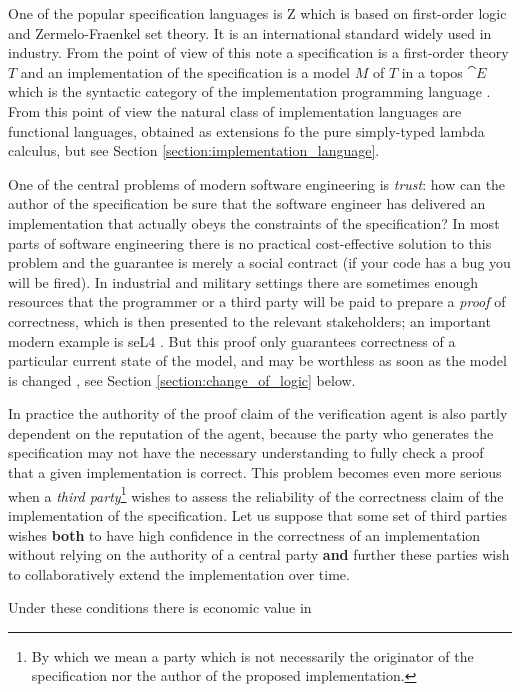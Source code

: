 \documentclass[english,letter paper,12pt,reqno]{article}
\theoremstyle{example}
\begin{document}
One of the popular specification languages is Z \cite{potter} which is based on first-order logic and Zermelo-Fraenkel set theory. It is an international standard widely used in industry. From the point of view of this note a specification is a first-order theory $T$ and an implementation of the specification is a model $M$ of $T$ in a topos $\cat{E}$ which is the syntactic category of the implementation programming language \cite{lambekscott}. From this point of view the natural class of implementation languages are functional languages, obtained as extensions fo the pure simply-typed lambda calculus, but see Section \ref{section:implementation_language}.

One of the central problems of modern software engineering is \emph{trust}: how can the author of the specification be sure that the software engineer has delivered an implementation that actually obeys the constraints of the specification? In most parts of software engineering there is no practical cost-effective solution to this problem and the guarantee is merely a social contract (if your code has a bug you will be fired). In industrial and military settings there are sometimes enough resources that the programmer or a third party will be paid to prepare a \emph{proof} of correctness, which is then presented to the relevant stakeholders; an important modern example is seL4 \cite{sel4}. But this proof only guarantees correctness of a particular current state of the model, and may be worthless as soon as the model is changed \cite{bp}, see Section \ref{section:change_of_logic} below.

In practice the authority of the proof claim of the verification agent is also partly dependent on the reputation of the agent, because the party who generates the specification may not have the necessary understanding to fully check a proof that a given implementation is correct. This problem becomes even more serious when a \emph{third party}\footnote{By which we mean a party which is not necessarily the originator of the specification nor the author of the proposed implementation.} wishes to assess the reliability of the correctness claim of the implementation of the specification. Let us suppose that some set of third parties wishes \textbf{both} to have high confidence in the correctness of an implementation without relying on the authority of a central party \textbf{and} further these parties wish to collaboratively extend the implementation over time. 

Under these conditions there is economic value in
\end{document}
